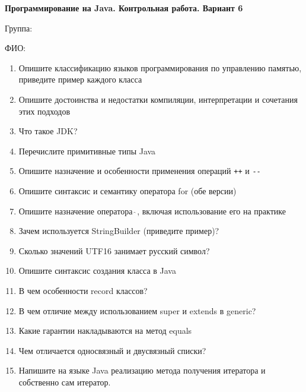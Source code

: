\documentclass[12pt]{article}
\begin{document}
\newpage\begin{minipage}{\textwidth}
\textbf{Программирование на Java. Контрольная работа. Вариант 6}

Группа: \underline{\hspace{3cm}}

ФИО: \underline{\hspace{10cm}}

\begin{enumerate}
\item Опишите классификацию языков программирования по управлению памятью, приведите пример каждого класса
\item Опишите достоинства и недостатки компиляции, интерпретации и сочетания этих подходов
\item Что такое JDK?
\item Перечислите примитивные типы Java
\item Опишите назначение и особенности применения операций \verb|++| и \verb|--|
\item Опишите синтаксис и семантику оператора for (обе версии)
\item Опишите назначение оператора $\hat{\ }$, включая использование его на практике
\item Зачем используется StringBuilder (приведите пример)?
\item Сколько значений UTF16 занимает русский символ?
\item Опишите синтаксис создания класса в Java
\item В чем особенности record классов?
\item В чем отличие между использованием super и extends в generic?
\item Какие гарантии накладываются на метод equals
\item Чем отличается односвязный и двусвязный списки?
\item Напишите на языке Java реализацию метода получения итератора и собственно сам итератор.

\end{enumerate}
\end{minipage}
\end{document}
